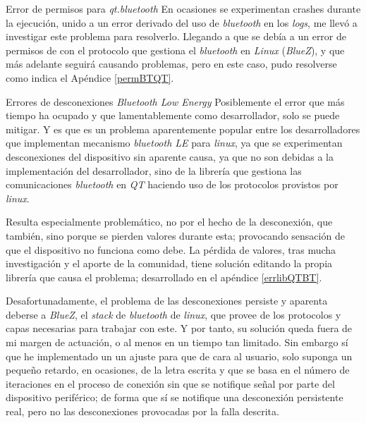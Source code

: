 \begin{problemas}{Error de permisos para \textit{qt.bluetooth}}
    \color{mitexto}
    En ocasiones se experimentan crashes durante la ejecución,
    unido a un error derivado del uso de \textit{bluetooth} en los \textit{logs}, me llevó
    a investigar este problema para resolverlo. Llegando
    a que se debía a un error de permisos de con el protocolo
    que gestiona el \textit{bluetooth} en \textit{Linux} (\textit{BlueZ}),
    y que más adelante seguirá causando problemas, pero en este caso, pudo
    resolverse como indica el Apéndice \ref{permBTQT}.
\end{problemas}

\begin{problemas}{Errores de desconexiones \textit{Bluetooth Low Energy}\label{errDescBT}}
    \color{mitexto}
    Posiblemente el error que más tiempo ha ocupado y que lamentablemente
    como desarrollador, solo se puede mitigar. Y es que es un problema
    aparentemente popular entre los desarrolladores que implementan 
    mecanismo \textit{bluetooth LE} para \textit{linux}, ya que se experimentan
    desconexiones del dispositivo sin aparente causa, ya que no son debidas
    a la implementación del desarrollador, sino de la librería que gestiona
    las comunicaciones \textit{bluetooth} en \textit{QT} haciendo uso de los
    protocolos provistos por \textit{linux}.

    Resulta especialmente problemático, no por el hecho de la desconexión,
    que también, sino porque se pierden valores durante esta; provocando
    sensación de que el dispositivo no funciona como debe. La pérdida de
    valores, tras mucha investigación y el aporte de la comunidad, tiene
    solución editando la propia librería que causa el problema;
    desarrollado en el apéndice \ref{errlibQTBT}.
    
    Desafortunadamente,
    el problema de las desconexiones persiste y aparenta deberse a
    \textit{BlueZ}, el \textit{stack} de \textit{bluetooth} de \textit{linux},
    que provee de los protocolos y capas necesarias para trabajar con este.
    Y por tanto, su solución queda fuera de mi margen de actuación, o al
    menos en un tiempo tan limitado. Sin embargo sí que he implementado un
    un ajuste para que de cara al usuario, solo suponga un pequeño retardo,
    en ocasiones, de la letra escrita y que se basa en el número de iteraciones
    en el proceso de conexión sin que se notifique señal por parte del
    dispositivo periférico; de forma que sí se notifique una desconexión
    persistente real, pero no las desconexiones provocadas por la falla
    descrita.
\end{problemas}

